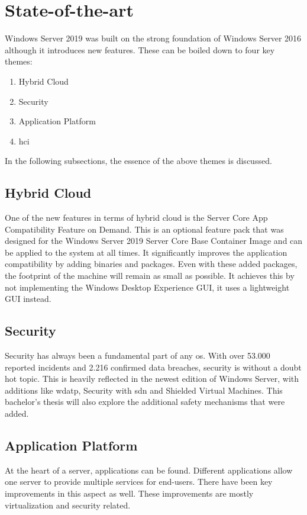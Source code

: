 \section{State-of-the-art}\label{sec:state-of-the-art}
Windows Server 2019 was built on the strong foundation of Windows Server 2016 although it introduces new features.\autocite{Gerend2018}
These can be boiled down to four key themes:
\begin{enumerate}
	\item Hybrid Cloud
	\item Security
	\item Application Platform
	\item  \acrfull{hci}
\end{enumerate}
In the following subsections, the essence of the above themes is discussed.
\subsection{Hybrid Cloud}
One of the new features in terms of hybrid cloud is the Server Core App Compatibility Feature on Demand.\autocite{Pacquer2018}
This is an optional feature pack that was designed for the Windows Server 2019 Server Core Base Container Image and can be applied to the system at all times. 
It significantly improves the application compatibility by adding binaries and packages. 
Even with these added packages, the footprint of the machine will remain as small as possible. 
It achieves this by not implementing the Windows Desktop Experience GUI, it uses a lightweight GUI instead.
\subsection{Security}
Security has always been a fundamental part of any \acrshort{os}. 
With over 53.000 reported incidents and 2.216 confirmed data breaches, security is without a doubt hot topic.\autocite{Verizon2018} 
This is heavily reflected in the newest edition of Windows Server, with additions like \acrfull{wdatp}, Security with \acrfull{sdn} and Shielded Virtual Machines. 
This bachelor's thesis will also explore the additional safety mechanisms that were added.
\subsection{Application Platform}
At the heart of a server, applications can be found. 
Different applications allow one server to provide multiple services for end-users. 
There have been key improvements in this aspect as well. 
These improvements are mostly virtualization and security related. 
